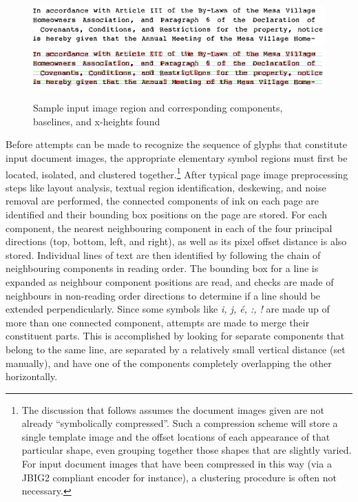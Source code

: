 \documentclass[times, 10pt,twocolumn]{article}
\begin{document}
\begin{figure}[ht]
  \centering
  \includegraphics[scale=1]{figures/input_lines}
  \includegraphics[scale=1]{figures/line_comps}
  \caption{Sample input image region and corresponding components, baselines,
           and x-heights found}
  \label{inimg_fig}
\end{figure}


Before attempts can be made to recognize the sequence of glyphs that 
constitute input document images, the appropriate elementary symbol regions 
must first be located, isolated, and clustered together.\footnote{The
discussion that follows assumes the document images given are not
already ``symbolically compressed''. Such a compression scheme will
store a single template image and the offset locations of each
appearance of that particular shape, even grouping together
those shapes that are slightly varied.  For input document images that
have been compressed in this way (via a JBIG2 compliant encoder 
for instance), a clustering procedure is often not necessary.}
After typical page image preprocessing steps like layout analysis, textual
region identification, deskewing, and noise removal are performed, the
connected components of ink on each page are identified and their bounding box
positions on the page are stored.  For each component, the nearest neighbouring
component in each of the four principal directions (top, bottom, left, and
right), as well as its pixel offset distance is also stored.  Individual lines
of text are then identified by following the chain of neighbouring components in
reading order.  The bounding box for a line is expanded as neighbour
component positions are read, and checks are made of neighbours in non-reading
order directions to determine if a line should be extended perpendicularly.
%
Since some symbols like {\em i, j, \'{e}, :, !} are made up of more than one
connected component, attempts are made to merge their constituent parts.  This
is accomplished by looking for separate components that belong to the same
line, are separated by a relatively small vertical distance (set manually), and
have one of the components completely overlapping the other horizontally.
\end{document}
